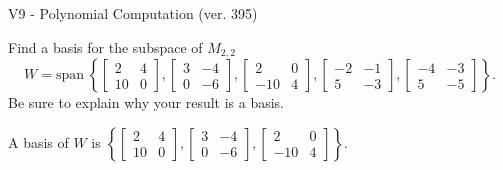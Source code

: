 \begin{exercise}
  \begin{exerciseTitle}V9 - Polynomial Computation (ver. 395)\end{exerciseTitle}
  \begin{exerciseStatement}
    Find a basis for the subspace of \(M_{2,2}\) 
\[W=\mathrm{span}\ \left\{\left[\begin{array}{cc}
2 & 4 \\
10 & 0
\end{array}\right] , \left[\begin{array}{cc}
3 & -4 \\
0 & -6
\end{array}\right] , \left[\begin{array}{cc}
2 & 0 \\
-10 & 4
\end{array}\right] , \left[\begin{array}{cc}
-2 & -1 \\
5 & -3
\end{array}\right] , \left[\begin{array}{cc}
-4 & -3 \\
5 & -5
\end{array}\right]\right\}.\]
 Be sure to explain why your result is a basis.


  \end{exerciseStatement}
  \begin{exerciseAnswer}
   A basis of \(W\) is  \(\left\{\left[\begin{array}{cc}
2 & 4 \\
10 & 0
\end{array}\right] , \left[\begin{array}{cc}
3 & -4 \\
0 & -6
\end{array}\right] , \left[\begin{array}{cc}
2 & 0 \\
-10 & 4
\end{array}\right]\right\}\).
  


  \end{exerciseAnswer}
\end{exercise}